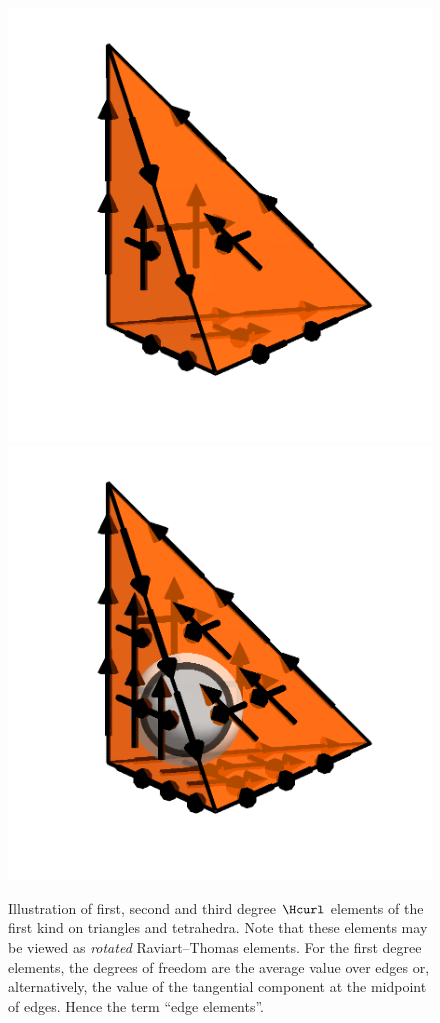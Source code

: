 \begin{figure}
\begin{center}
    \includegraphics[width=\elmfigsizetriple]{chapters/kirby-6/png/NED1_2_3d.png}
    \includegraphics[width=\elmfigsizetriple]{chapters/kirby-6/png/NED1_3_3d.png}
    \caption{Illustration of first, second and third degree \nedelec{}
      $\Hcurl$ elements of the first kind on triangles and
      tetrahedra. Note that these elements may be viewed as
      \emph{rotated} Raviart--Thomas elements. For the first degree
      \nedelec{} elements, the degrees of freedom are the average
      value over edges or, alternatively, the value of the tangential
      component at the midpoint of edges. Hence the term ``edge
      elements''.}
  \end{center}
  \label{kirby-6:fig:ned1}
\end{figure}

